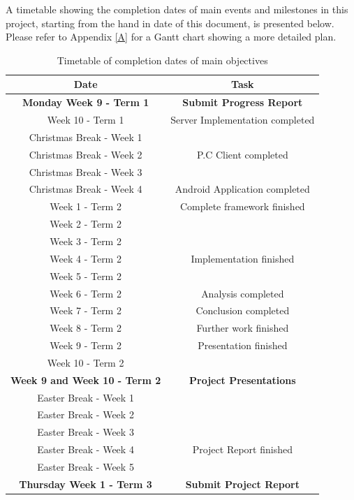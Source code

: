 \documentclass[a4paper,11pt]{article}
\begin{document}
A timetable showing the completion dates of main events and milestones in this project, starting from the hand in date of this document, is presented below. Please refer to Appendix \ref{A} for a Gantt chart showing a more detailed plan.

\begin{table}[htbp]
\begin{tabular}{|c|c|}
\hline
Date & Task \\ \hline
\textbf{Monday Week 9 - Term 1} & \textbf{Submit Progress Report} \\ \hline
Week 10 - Term 1 & Server Implementation completed \\ \hline
Christmas Break - Week 1 &  \\ \hline
Christmas Break - Week 2 & P.C Client completed \\ \hline
Christmas Break - Week 3 &  \\ \hline
Christmas Break - Week 4 & Android Application completed \\ \hline
Week 1 - Term 2 & Complete framework finished \\ \hline
Week 2 - Term 2 &  \\ \hline
Week 3 - Term 2 &  \\ \hline
Week 4 - Term 2 & Implementation finished \\ \hline
Week 5 - Term 2 &  \\ \hline
Week 6 - Term 2 & Analysis completed \\ \hline
Week 7 - Term 2 & Conclusion completed \\ \hline
Week 8 - Term 2 & Further work finished \\ \hline
Week 9 - Term 2 & Presentation finished \\ \hline
Week 10 - Term 2 &  \\ \hline
\textbf{Week 9 and Week 10 - Term 2} & \textbf{Project Presentations} \\ \hline
Easter Break - Week 1 &  \\ \hline
Easter Break - Week 2 &  \\ \hline
Easter Break - Week 3 &  \\ \hline
Easter Break - Week 4 & Project Report finished \\ \hline
Easter Break - Week 5 &  \\ \hline
\textbf{Thursday Week 1 - Term 3} & \textbf{Submit Project Report} \\ \hline
\end{tabular}
\caption{Timetable of completion dates of main objectives}
\label{timetable}
\end{table}
\end{document}
